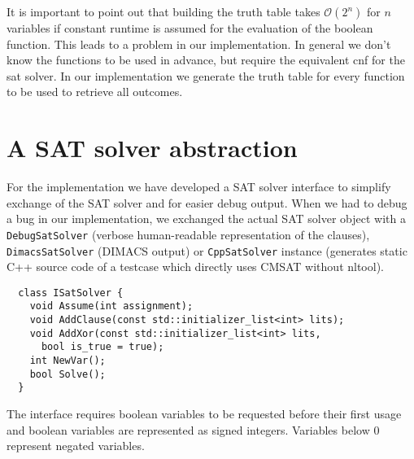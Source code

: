 It is important to point out that building the truth table takes $\mathcal{O}(2^n)$ for $n$ variables if constant runtime is assumed for the evaluation of the boolean function. This leads to a problem in our implementation. In general we don't know the functions to be used in advance, but require the equivalent \gls{cnf} for the \gls{sat} solver. In our implementation we generate the truth table for every function to be used to retrieve all outcomes.


\section{A SAT solver abstraction}
\label{sec:satsolver-abstraction}
%
For the implementation we have developed a SAT solver interface to simplify exchange of the SAT solver and for easier debug output. When we had to debug a bug in our implementation, we exchanged the actual SAT solver object with a \texttt{DebugSatSolver} (verbose human-readable representation of the clauses), \texttt{DimacsSatSolver} (DIMACS output) or \texttt{CppSatSolver} instance (generates static C++ source code of a testcase which directly uses CMSAT without nltool).

\begin{lstlisting}
  class ISatSolver {
    void Assume(int assignment);
    void AddClause(const std::initializer_list<int> lits);
    void AddXor(const std::initializer_list<int> lits,
      bool is_true = true);
    int NewVar();
    bool Solve();
  }
\end{lstlisting}

The interface requires boolean variables to be requested before their first usage and boolean variables are represented as signed integers. Variables below 0 represent negated variables.
